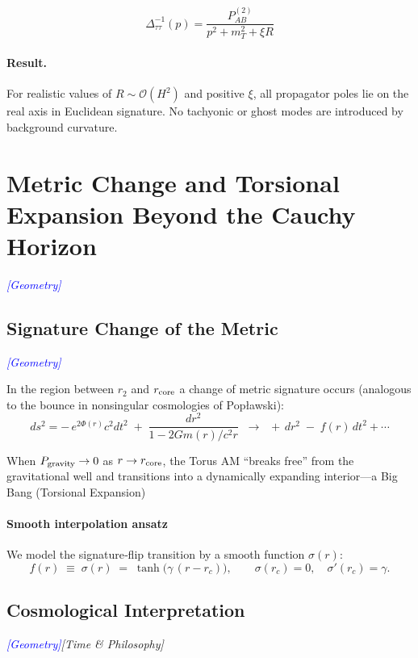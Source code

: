 \documentclass{article}
\newcommand{\geometrytag}{\textcolor{blue}{\textit{[Geometry]}}}
\newcommand{\timetag}{\textcolor{orange!80!black}{\textit{[Time \& Philosophy]}}}
\begin{document}
\begin{equation}
\Delta^{-1}_{\tau\tau}(p) = \frac{P^{(2)}_{AB}}{p^2 + m_T^2 + \xi R}
\tag{212}
\end{equation}

\paragraph{Result.} For realistic values of \( R \sim \mathcal{O}(H^2) \) and positive \( \xi \), all propagator poles lie on the real axis in Euclidean signature. No tachyonic or ghost modes are introduced by background curvature.



\section{Metric Change and Torsional Expansion Beyond the Cauchy Horizon}
\label{sec:metric_switch}
\geometrytag

\subsection{Signature Change of the Metric}
\geometrytag

In the region between $r_2$ and $r_{\rm core}$ a change of metric signature occurs (analogous to the bounce in nonsingular cosmologies of Popławski):
\[
  ds^2 = -\,e^{2\Phi(r)}c^2dt^2 \;+\; \frac{dr^2}{1-2Gm(r)/c^2r}
  \;\;\longrightarrow\;\;
  +\,dr^2 \;-\; f(r)\,dt^2 + \cdots
\]

When $P_{\rm gravity}\to 0$ as $r\to r_{\rm core}$, the Torus AM “breaks free” from the gravitational well and transitions into a dynamically expanding interior—a Big Bang (Torsional Expansion)

\paragraph{Smooth interpolation ansatz}
We model the signature‐flip transition by a smooth function $\sigma(r)$:
\begin{equation}\label{eq:auto95}
f(r)\;\equiv\;\sigma(r)
  \;=\;\tanh\!\bigl(\gamma\,(r - r_c)\bigr),
  \qquad
  \sigma(r_c)=0,\quad\sigma'(r_c)=\gamma.
\end{equation}


\subsection{Cosmological Interpretation}
\geometrytag   \timetag
\end{document}
